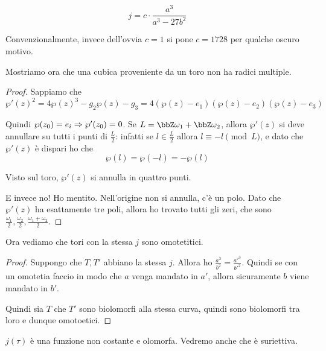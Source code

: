 	\[
		j = c \cdot \frac {a^3}{a^3-27b^2}
	\]

	Convenzionalmente, invece dell'ovvia $c=1$ si pone $c=1728$ per qualche oscuro motivo.
	
	Mostriamo ora che una cubica proveniente da un toro non ha radici multiple.
	
	\begin{proof}
		Sappiamo che 
		\[
			\wp'(z)^2=4\wp(z)^3-g_2\wp(z)-g_3 = 4(\wp(z)-e_1)(\wp(z)-e_2)(\wp(z)-e_3)
		\]
		
		Quindi $\wp(z_0)=e_i \Rightarrow\wp'(z_0)=0$.
		Se $L=\bbZ\omega_1 + \bbZ\omega_2$, allora $\wp'(z)$ si deve annullare su tutti i punti di $\frac L2$: infatti se $l \in \frac L2$ allora $l \equiv -l \pmod L$, e dato che $\wp'(z)$ è dispari ho che 
		\[
			\wp(l) = \wp(-l) = -\wp(l)
		\]
		
		Visto sul toro, $\wp'(z)$ si annulla in quattro punti.
		
		E invece no! Ho mentito. Nell'origine non si annulla, c'è un polo. Dato che $\wp'(z)$ ha esattamente tre poli, allora ho trovato tutti gli zeri, che sono $\frac{\omega_1}2, \frac{\omega_2}2, \frac{\omega_1+\omega_2}2$.
		

	\end{proof}

	Ora vediamo che tori con la stessa $j$ sono omotetitici.
	
	\begin{proof}
		Suppongo che $T, T'$ abbiano la stessa $j$. Allora ho $\frac{a^3}{b^2}=\frac{a'^3}{b'^2}$. Quindi se con un omotetia faccio in modo che $a$ venga mandato in $a'$, allora sicuramente $b$ viene mandato in $b'$. %
		
		Quindi sia $T$ che $T'$ sono biolomorfi alla stessa curva, quindi sono biolomorfi tra loro e dunque omotoetici.
	\end{proof}
	
	\begin{osservazione}
		$j(\tau)$ è una funzione non costante e olomorfa. Vedremo anche che è suriettiva.
	\end{osservazione}
